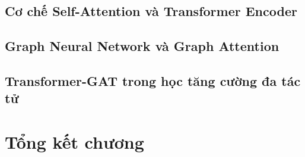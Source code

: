 \subsection{Cơ chế Self-Attention và Transformer Encoder}
\label{subsec:bg:transformer}

\subsection{Graph Neural Network và Graph Attention}
\label{subsec:bg:gat}

\subsection{Transformer-GAT trong học tăng cường đa tác tử}
\label{subsec:bg:tmac}

\section{Tổng kết chương}
\label{sec:bg:summary}
